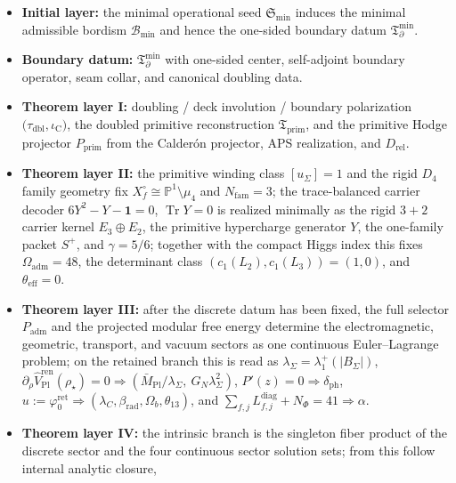 \documentclass[11pt,a4paper]{article}
\theoremstyle{definition}
\theoremstyle{remark}
\DeclareMathOperator{\tr}{Tr}
\newcommand{\taudbl}{\tau_{\mathrm{dbl}}}
\newcommand{\iC}{\iota_{\mathrm C}}
\newcommand{\Mpl}{\bar M_{\mathrm{Pl}}}
\newcommand{\phiz}{\varphi_0^{\mathrm{ret}}}
\newcommand{\Tbound}{\mathfrak T_{\partial}^{\min}}
\newcommand{\Tprim}{\mathfrak T_{\mathrm{prim}}}
\newcommand{\Padm}{P_{\mathrm{adm}}}
\newcommand{\Pprim}{P_{\mathrm{prim}}}
\begin{document}
\begin{tcolorbox}[colback=tfptblue!2, colframe=tfptblue!40, breakable,
    title={Closed theorem surface}, colbacktitle=tfptblue!60]
\begin{itemize}[leftmargin=1.5em, topsep=3pt, itemsep=3pt]
    \item \textbf{Initial layer:} the minimal operational seed $\mathfrak S_{\min}$ induces the minimal admissible bordism $\mathcal B_{\min}$ and hence the one-sided boundary datum $\Tbound$.
    \item \textbf{Boundary datum:} $\Tbound$ with one-sided center, self-adjoint boundary operator, seam collar, and canonical doubling data.
    \item \textbf{Theorem layer I:} doubling / deck involution / boundary polarization $\bigl(\taudbl,\iC\bigr)$, the doubled primitive reconstruction $\Tprim$, and the primitive Hodge projector $\Pprim$ from the Calder\'on projector, APS realization, and $D_{\mathrm{rel}}$.
    \item \textbf{Theorem layer II:} the primitive winding class $[u_\Sigma]=1$ and the rigid $D_4$
    family geometry fix $X_f^\circ\cong\mathbb P^1\setminus\mu_4$ and $N_{\mathrm{fam}}=3$; the
    trace-balanced carrier decoder $6Y^2-Y-\mathbf 1=0$, $\tr Y=0$ is realized minimally as the
    rigid $3+2$ carrier kernel $E_3\oplus E_2$, the primitive hypercharge generator $Y$, the
    one-family packet $S^+$, and $\gamma=5/6$; together with the compact Higgs index this fixes
    $\Omega_{\mathrm{adm}}=48$, the determinant class $(c_1(L_2),c_1(L_3))=(1,0)$, and
    $\theta_{\mathrm{eff}}=0$.
    \item \textbf{Theorem layer III:} after the discrete datum has been fixed, the full selector
    $\Padm$ and the projected modular free energy determine the electromagnetic, geometric,
    transport, and vacuum sectors as one continuous Euler--Lagrange problem; on the retained branch
    this is read as $\lambda_\Sigma=\lambda_1^+(|B_\Sigma|)$,
    $\partial_\rho\widehat V_{\mathrm{Pl}}^{\mathrm{ren}}(\rho_\star)=0\Rightarrow(\Mpl/\lambda_\Sigma,\ G_N\lambda_\Sigma^2)$,
    $P'(z)=0\Rightarrow\delta_{\mathrm{ph}}$,
    $u:=\phiz\Rightarrow(\lambda_C,\beta_{\mathrm{rad}},\Omega_b,\theta_{13})$, and
    $\sum_{f,j}L_{f,j}^{\mathrm{diag}}+N_\Phi=41\Rightarrow\alpha$.
    \item \textbf{Theorem layer IV:} the intrinsic branch is the singleton fiber product of the discrete
    sector and the four continuous sector solution sets; from this follow internal analytic closure,

\end{itemize}
\end{tcolorbox}
\end{document}
